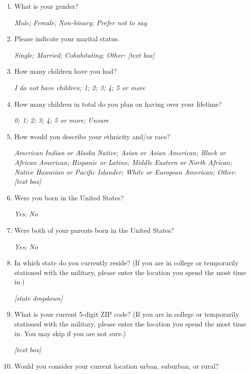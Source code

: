 \documentclass[11pt, headsepline]{article}
\begin{document}
\begin{enumerate}[resume]

    \item What is your gender?

    \textit{Male; Female; Non-binary; Prefer not to say}

    \item Please indicate your marital status.

    \textit{Single; Married; Cohabitating; Other: [text box]}

    \item How many children have you had?

    \textit{I do not have children; 1; 2; 3; 4; 5 or more}

    \item How many children in total do you plan on having over your lifetime?

    \textit{0; 1; 2; 3; 4; 5 or more; Unsure}

    \item How would you describe your ethnicity and/or race?

    \textit{American Indian or Alaska Native; Asian or Asian American; Black or African American; Hispanic or Latino; Middle Eastern or North African; Native Hawaiian or Pacific Islander; 
    White or European American; Other: [text box]}

    \item Were you born in the United States?

    \textit{Yes; No}

    \item Were both of your parents born in the United States?

    \textit{Yes; No}

    \item In which state do you currently reside? (If you are in college or temporarily stationed with the military, please enter the location you spend the most time in.)

    \textit{[state dropdown]}

    \item What is your current 5-digit ZIP code? (If you are in college or temporarily stationed with the military, please enter the location you spend the most time in. You may skip if you are not sure.)

    \textit{[text box]}

    \item Would you consider your current location urban, suburban, or rural?


\end{enumerate}
\end{document}
